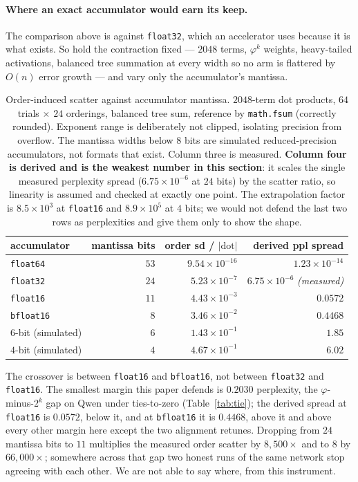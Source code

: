 \documentclass[11pt]{article}
\theoremstyle{definition}
\begin{document}
\paragraph{Where an exact accumulator would earn its keep.} The comparison above
is against \texttt{float32}, which an accelerator uses because it is what exists.
So hold the contraction fixed --- $2048$ terms, $\varphi^{k}$ weights,
heavy-tailed activations, balanced tree summation at every width so no arm is
flattered by $O(n)$ error growth --- and vary only the accumulator's mantissa.

\begin{table}[t]\centering
\caption{Order-induced scatter against accumulator mantissa. $2048$-term dot
products, $64$ trials $\times$ $24$ orderings, balanced tree sum, reference by
\texttt{math.fsum} (correctly rounded). Exponent range is deliberately not
clipped, isolating precision from overflow. The mantissa widths below $8$ bits
are simulated reduced-precision accumulators, not formats that exist. Column
three is measured. \textbf{Column four is derived and is the weakest number in
this section}: it scales the single measured perplexity spread
($6.75\times10^{-6}$ at $24$ bits) by the scatter ratio, so linearity is assumed
and checked at exactly one point. The extrapolation factor is $8.5\times10^{3}$
at \texttt{float16} and $8.9\times10^{5}$ at $4$ bits; we would not defend the
last two rows as perplexities and give them only to show the shape.}
\label{tab:accscatter}
\begin{tabular}{lrrr}
\toprule
accumulator & mantissa bits & order sd / $|\mathrm{dot}|$ & derived ppl spread \\
\midrule
\texttt{float64}  & $53$ & $9.54\times10^{-16}$ & $1.23\times10^{-14}$ \\
\texttt{float32}  & $24$ & $5.23\times10^{-7}$  & $6.75\times10^{-6}$ \emph{(measured)} \\
\texttt{float16}  & $11$ & $4.43\times10^{-3}$  & $0.0572$ \\
\texttt{bfloat16} & $8$  & $3.46\times10^{-2}$  & $0.4468$ \\
$6$-bit (simulated) & $6$  & $1.43\times10^{-1}$  & $1.85$ \\
$4$-bit (simulated) & $4$  & $4.67\times10^{-1}$  & $6.02$ \\
\bottomrule
\end{tabular}
\end{table}

The crossover is between \texttt{float16} and \texttt{bfloat16}, not between
\texttt{float32} and \texttt{float16}. The smallest margin this paper
defends is $0.2030$ perplexity, the $\varphi$-minus-$2^{k}$ gap on Qwen under
ties-to-zero (Table~\ref{tab:tie}); the derived spread at \texttt{float16} is
$0.0572$, below it, and at \texttt{bfloat16} it is $0.4468$, above it and above
every other margin here except the two alignment retunes. Dropping from $24$ mantissa bits to $11$
multiplies the measured order scatter by $8{,}500\times$ and to $8$ by
$66{,}000\times$; somewhere across that gap two honest runs of the same network
stop agreeing with each other. We are not able to say where, from this
instrument.
\end{document}
